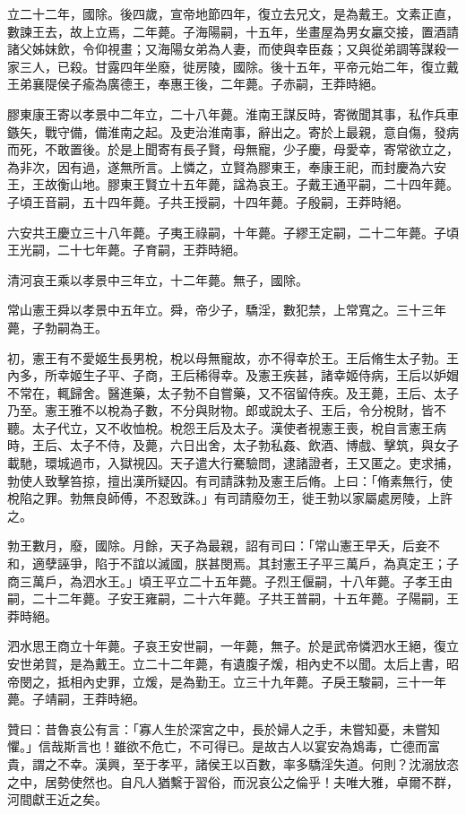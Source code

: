 \begin{pinyinscope}
立二十二年，國除。後四歲，宣帝地節四年，復立去兄文，是為戴王。文素正直，數諫王去，故上立焉，二年薨。子海陽嗣，十五年，坐畫屋為男女臝交接，置酒請諸父姊妺飲，令仰視畫；又海陽女弟為人妻，而使與幸臣姦；又與從弟調等謀殺一家三人，已殺。甘露四年坐廢，徙房陵，國除。後十五年，平帝元始二年，復立戴王弟襄隄侯子瘉為廣德王，奉惠王後，二年薨。子赤嗣，王莽時絕。

膠東康王寄以孝景中二年立，二十八年薨。淮南王謀反時，寄微聞其事，私作兵車鏃矢，戰守備，備淮南之起。及吏治淮南事，辭出之。寄於上最親，意自傷，發病而死，不敢置後。於是上聞寄有長子賢，母無寵，少子慶，母愛幸，寄常欲立之，為非次，因有過，遂無所言。上憐之，立賢為膠東王，奉康王祀，而封慶為六安王，王故衡山地。膠東王賢立十五年薨，諡為哀王。子戴王通平嗣，二十四年薨。子頃王音嗣，五十四年薨。子共王授嗣，十四年薨。子殷嗣，王莽時絕。

六安共王慶立三十八年薨。子夷王祿嗣，十年薨。子繆王定嗣，二十二年薨。子頃王光嗣，二十七年薨。子育嗣，王莽時絕。

清河哀王乘以孝景中三年立，十二年薨。無子，國除。

常山憲王舜以孝景中五年立。舜，帝少子，驕淫，數犯禁，上常寬之。三十三年薨，子勃嗣為王。

初，憲王有不愛姬生長男梲，梲以母無寵故，亦不得幸於王。王后脩生太子勃。王內多，所幸姬生子平、子商，王后稀得幸。及憲王疾甚，諸幸姬侍病，王后以妒媢不常在，輒歸舍。醫進藥，太子勃不自嘗藥，又不宿留侍疾。及王薨，王后、太子乃至。憲王雅不以梲為子數，不分與財物。郎或說太子、王后，令分梲財，皆不聽。太子代立，又不收恤梲。梲怨王后及太子。漢使者視憲王喪，梲自言憲王病時，王后、太子不侍，及薨，六日出舍，太子勃私姦、飲酒、博戲、擊筑，與女子載馳，環城過市，入獄視囚。天子遣大行騫驗問，逮諸證者，王又匿之。吏求捕，勃使人致擊笞掠，擅出漢所疑囚。有司請誅勃及憲王后脩。上曰：「脩素無行，使梲陷之罪。勃無良師傅，不忍致誅。」有司請廢勿王，徙王勃以家屬處房陵，上許之。

勃王數月，廢，國除。月餘，天子為最親，詔有司曰：「常山憲王早夭，后妾不和，適孽誣爭，陷于不誼以滅國，朕甚閔焉。其封憲王子平三萬戶，為真定王；子商三萬戶，為泗水王。」頃王平立二十五年薨。子烈王偃嗣，十八年薨。子孝王由嗣，二十二年薨。子安王雍嗣，二十六年薨。子共王普嗣，十五年薨。子陽嗣，王莽時絕。

泗水思王商立十年薨。子哀王安世嗣，一年薨，無子。於是武帝憐泗水王絕，復立安世弟賀，是為戴王。立二十二年薨，有遺腹子煖，相內史不以聞。太后上書，昭帝閔之，抵相內史罪，立煖，是為勤王。立三十九年薨。子戾王駿嗣，三十一年薨。子靖嗣，王莽時絕。

贊曰：昔魯哀公有言：「寡人生於深宮之中，長於婦人之手，未嘗知憂，未嘗知懼。」信哉斯言也！雖欲不危亡，不可得已。是故古人以宴安為鴆毒，亡德而富貴，謂之不幸。漢興，至于孝平，諸侯王以百數，率多驕淫失道。何則？沈溺放恣之中，居勢使然也。自凡人猶繫于習俗，而況哀公之倫乎！夫唯大雅，卓爾不群，河間獻王近之矣。


\end{pinyinscope}